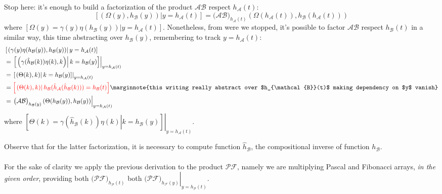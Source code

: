 \documentclass[11pt,a4paper]{article} %
\begin{document}
    Stop here: it's enough to build a factorization of the product $\mathcal{A}\mathcal{B}$ 
    respect $h_{\mathcal{A}}(t)$:
    \begin{displaymath}
            \left[\left.\left(\Omega(y), h_{\mathcal{B}}(y)  \right) \right| y=h_{\mathcal{A}}(t) \right] 
            =\big(\mathcal{A}\mathcal{B}\big)_{h_{\mathcal{A}}(t)}\left(
                \Omega(h_{\mathcal{A}}(t)), h_{\mathcal{B}}(h_{\mathcal{A}}(t))  \right)
    \end{displaymath}
    where $\left[\Omega(y)= \gamma(y)\eta(h_{\mathcal{B}}(y))| y=h_{\mathcal{A}}(t) \right]$. 
    Nonetheless, from were we stopped, it's possible to factor $\mathcal{A}\mathcal{B}$ respect $h_{\mathcal{B}}(t)$ in
    a similar way, this time abstracting over $h_{\mathcal{B}}(y)$, remembering to track $y=h_{\mathcal{A}}(t)$:
    \begin{displaymath}
        \begin{split}
            &\left[\left.\left(\gamma(y)\eta(h_{\mathcal{B}}(y)), h_{\mathcal{B}}(y)  \right) \right|
                 y=h_{\mathcal{A}}(t) \right]\\
            &=\left.\left[\left.\left(\gamma(\hat{h}_{\mathcal{B}}(k))\eta(k), k  \right) \right|
                 k=h_{\mathcal{B}}(y) \right]\right|_{y=h_{\mathcal{A}}(t)}\\
            &=\left.\left[\left.\left(\Theta(k), k  \right) \right| k=h_{\mathcal{B}}(y) \right]\right|_{y=h_{\mathcal{A}}(t)}\\
            &=\textcolor{red}{\left[\left.\left(\Theta(k), k  \right) \right| 
                h_{\mathcal{B}}(\hat{h}_{\mathcal{A}}(\hat{h}_{\mathcal{B}}(k)))=h_{\mathcal{B}}(t) \right]} 
                \marginnote{this writing really abstract over $h_{\mathcal{B}}(t)$ making dependency on $y$ vanish}\\
            &=\left.\big(\mathcal{A}\mathcal{B}\big)_{h_{\mathcal{B}}(y)}\left(
                \Theta(h_{\mathcal{B}}(y)), h_{\mathcal{B}}(y)  \right)\right|_{y=h_{\mathcal{A}}(t)}
        \end{split}
    \end{displaymath}
    where $\left.\left[\left.\Theta(k)=\gamma(\hat{h}_{\mathcal{B}}(k))\eta(k) \right| 
        k=h_{\mathcal{B}}(y) \right]\right|_{y=h_{\mathcal{A}}(t)}$.

    Observe that for the latter factorization, it is necessary to compute function $\hat{h}_{\mathcal{B}}$, 
    the compositional inverse of function $h_{\mathcal{B}}$.
    \\\\
    For the sake of clarity we apply the previous derivation to the product $\mathcal{P}\mathcal{F}$, namely
    we are multiplying Pascal and Fibonacci arrays, \emph{in the given order}, providing 
    both $\big(\mathcal{P}\mathcal{F}\big)_{h_{\mathcal{P}}(t)}$ 
    both $\left.\big(\mathcal{P}\mathcal{F}\big)_{h_{\mathcal{F}}(y)}\right|_{y=h_{\mathcal{P}}(t)}$.
\end{document}
